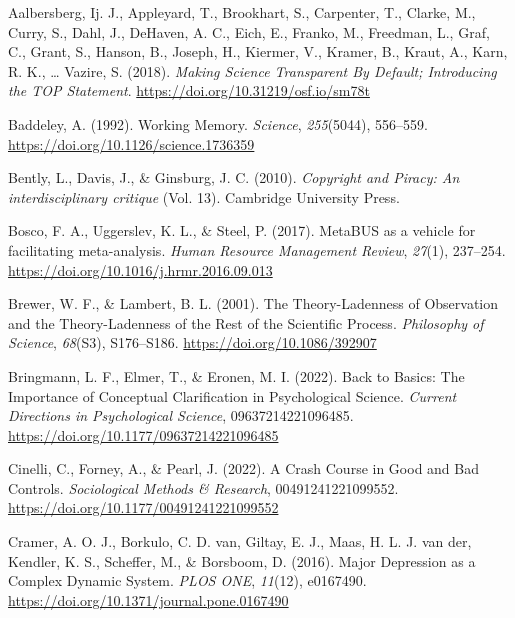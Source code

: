 \documentclass[man]{apa7}
\newlength{\cslhangindent}
\newenvironment{CSLReferences}[2] %
 {\begin{list}{}{%
  \setlength{\itemindent}{0pt}
  \setlength{\leftmargin}{0pt}
  \setlength{\parsep}{0pt}
  \ifodd #1
   \setlength{\leftmargin}{\cslhangindent}
   \setlength{\itemindent}{-1\cslhangindent}
  \fi
  \setlength{\itemsep}{#2\baselineskip}}}
 {\end{list}}
\begin{document}
\label{refs}
\begin{CSLReferences}{1}{0}
Aalbersberg, Ij. J., Appleyard, T., Brookhart, S., Carpenter, T., Clarke, M., Curry, S., Dahl, J., DeHaven, A. C., Eich, E., Franko, M., Freedman, L., Graf, C., Grant, S., Hanson, B., Joseph, H., Kiermer, V., Kramer, B., Kraut, A., Karn, R. K., \ldots{} Vazire, S. (2018). \emph{Making {Science Transparent By Default}; {Introducing} the {TOP Statement}}. \url{https://doi.org/10.31219/osf.io/sm78t}

Baddeley, A. (1992). Working {Memory}. \emph{Science}, \emph{255}(5044), 556--559. \url{https://doi.org/10.1126/science.1736359}

Bently, L., Davis, J., \& Ginsburg, J. C. (2010). \emph{Copyright and {Piracy}: {An} interdisciplinary critique} (Vol. 13). Cambridge University Press.

Bosco, F. A., Uggerslev, K. L., \& Steel, P. (2017). {MetaBUS} as a vehicle for facilitating meta-analysis. \emph{Human Resource Management Review}, \emph{27}(1), 237--254. \url{https://doi.org/10.1016/j.hrmr.2016.09.013}

Brewer, W. F., \& Lambert, B. L. (2001). The {Theory-Ladenness} of {Observation} and the {Theory-Ladenness} of the {Rest} of the {Scientific Process}. \emph{Philosophy of Science}, \emph{68}(S3), S176--S186. \url{https://doi.org/10.1086/392907}

Bringmann, L. F., Elmer, T., \& Eronen, M. I. (2022). Back to {Basics}: {The Importance} of {Conceptual Clarification} in {Psychological Science}. \emph{Current Directions in Psychological Science}, 09637214221096485. \url{https://doi.org/10.1177/09637214221096485}

Cinelli, C., Forney, A., \& Pearl, J. (2022). A {Crash Course} in {Good} and {Bad Controls}. \emph{Sociological Methods \& Research}, 00491241221099552. \url{https://doi.org/10.1177/00491241221099552}

Cramer, A. O. J., Borkulo, C. D. van, Giltay, E. J., Maas, H. L. J. van der, Kendler, K. S., Scheffer, M., \& Borsboom, D. (2016). Major {Depression} as a {Complex Dynamic System}. \emph{PLOS ONE}, \emph{11}(12), e0167490. \url{https://doi.org/10.1371/journal.pone.0167490}


\end{CSLReferences}
\end{document}
